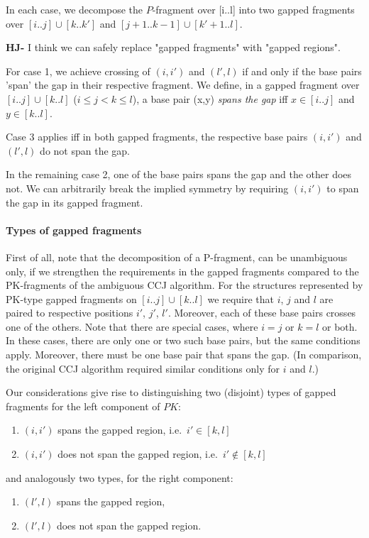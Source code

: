 \documentclass[11pt]{article} %
\def\mySecStr#1{\expandafter {\tt #1}\& }
\def\mySecStrAll#1{\ifx#1\mySecStrAll\else\mySecStr#1\expandafter\mySecStrAll\fi}
\newcommand{\RNA}[3][]{
\begin{tikzpicture}[baseline={([yshift=-.5ex]rna)}]
  \matrix[matrix of nodes,nodes=cell,ampersand replacement=\&] (rna){
		\mySecStrAll #2 \mySecStrAll\\
		};
\ifthenelse{\equal{#3}{}}{}{%
	\foreach \x/\y in {#3}{\draw (rna-1-\x) edge[bp] (rna-1-\y);}%
}
\ifthenelse{\equal{#1}{}}{}{%
		\foreach \x/\y in {#1}{\draw (rna-1-\x) edge[altbp] (rna-1-\y);}%
		}
\end{tikzpicture}}
\newcommand{\PKnone}{P\!K}
\begin{document}
In each case, we decompose the $P$-fragment over [i..l] into two gapped fragments over $[i..j]\cup[k..k']$ and $[j+1..k-1]\cup[k'+1..l]$. 

\textbf{HJ-} I think we can safely replace "gapped fragments" with "gapped regions".

%

For case 1, we achieve crossing of $(i,i')$ and $(l',l)$ if and only if the
base pairs 'span' the gap in their respective fragment. We define, in a gapped
fragment over $[i..j]\cup[k..l]$ ($i\leq j<k\leq l$), a base pair (x,y)
\emph{spans the gap} iff $x\in[i..j]$ and $y\in[k..l]$.

Case 3 applies iff in both gapped fragments, the respective base pairs $(i,i')$ and $(l',l)$ do not span the gap.

In the remaining case 2, one of the base pairs spans the gap and the other does
not. We can arbitrarily break the implied symmetry by requiring $(i,i')$ to
span the gap in its gapped fragment.

\paragraph{Types of gapped fragments}

First of all, note that the decomposition of a P-fragment, can be unambiguous
only, if we strengthen the requirements in the gapped fragments compared to the
PK-fragments of the ambiguous CCJ algorithm.  For the structures represented by
PK-type gapped fragments on $[i..j]\cup[k..l]$ we require that $i$, $j$ and $l$
are paired to respective positions $i'$, $j'$, $l'$. Moreover, each of these
base pairs crosses one of the others.  Note that there are special
cases, where $i=j$ or $k=l$ or both. In these cases, there are only one or two
such base pairs, but the same conditions apply. Moreover, there must be one
base pair that spans the gap. (In comparison, the original CCJ algorithm
required similar conditions only for $i$ and $l$.)

Our considerations give rise to distinguishing two (disjoint) types of gapped
fragments for the left component of $\PKnone$:
\begin{enumerate}
\item $(i,i')$ spans the gapped region, i.e.\ $i'\in[k,l]$
\item $(i,i')$ does not span the gapped region, i.e.\ $i'\not\in[k,l]$ 
\end{enumerate}
and analogously two types, for the right component:
\begin{enumerate}
\item $(l',l)$ spans the gapped region,
\item $(l',l)$ does not span the gapped region.
\end{enumerate}
\end{document}
